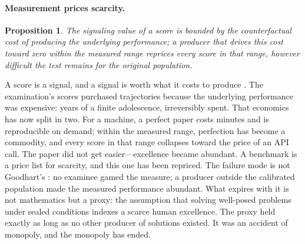 \documentclass[11pt]{article}
\theoremstyle{plain}
\newtheorem{proposition}{Proposition}
\begin{document}
\paragraph{Measurement prices scarcity.}
\begin{proposition}\label{prop:repricing}
The signaling value of a score is bounded by the counterfactual cost of
producing the underlying performance; a producer that drives this cost
toward zero within the measured range reprices every score in that
range, however difficult the test remains for the original population.
\end{proposition}
A score is a signal, and a signal is worth what it costs to produce
\citep{spence1973job}. The
examination's scores purchased trajectories because the underlying
performance was expensive: years of a finite adolescence, irreversibly
spent. That economics has now split in two. For a machine, a perfect
paper costs minutes and is reproducible on demand; within the measured
range, perfection has become a commodity, and every score in that range
collapses toward the price of an API call. The paper did not get
easier---excellence became abundant. A benchmark is a price list for
scarcity, and this one has been repriced. The failure mode is not
Goodhart's \citep{strathern1997improving}: no examinee gamed the measure;
a producer outside the calibrated population made the measured
performance abundant. What expires with it is not
mathematics but a proxy: the assumption that solving well-posed problems
under sealed conditions indexes a scarce human excellence. The proxy held
exactly as long as no other producer of solutions existed. It was an
accident of monopoly, and the monopoly has ended.
\end{document}
